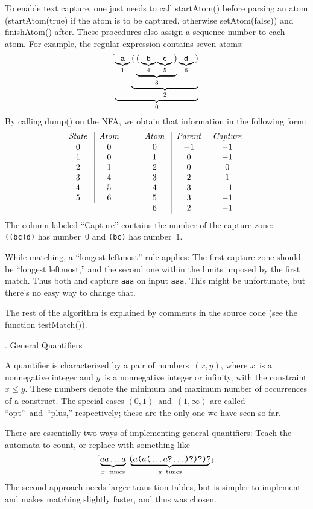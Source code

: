 To enable text capture, one just needs to call {\sf startAtom()} before parsing
an atom ({\sf startAtom(true)} if the atom is to be captured, otherwise {\sf
setAtom(false)}) and {\sf finishAtom()} after. These procedures also assign a
sequence number to each atom. For example, the regular expression 
contains seven atoms:
  $$\hbox{{$^{\scriptscriptstyle\lceil}$\tt$\underbrace{\underbrace{\tt a}_1\underbrace{{\tt (}
    \underbrace{{\tt (}\underbrace{\tt b}_4\underbrace{\tt
    c}_5{\tt )}}_3\underbrace{\tt d}_6{\tt )}}_2}_0$$\scriptscriptstyle\rfloor$}}$$
By calling {\sf dump()} on
the NFA, we obtain that information in the following form:
  $$\vtop{\halign{\g{$#$} \vrule & \g{$#$}\cr
    {\it State\/} & {\it Atom\/} \cr
  \noalign{\hrule}
    0             & 0 \cr
    1             & 0 \cr
    2             & 1 \cr
    3             & 4 \cr
    4             & 5 \cr
    5             & 6 \cr
  }}\qquad\vtop{\halign{\g{$#$} \vrule && \g{$#$} \cr
    {\it Atom\/} & {\it Parent\/} & {\it Capture\/} \cr
  \noalign{\hrule}
    0            &  -1            & -1 \cr
    1            &  0             & -1 \cr
    2            &  0             &  0 \cr
    3            &  2             &  1 \cr
    4            &  3             & -1 \cr
    5            &  3             & -1 \cr
    6            &  2             & -1 \cr
  }}$$
The column labeled ``Capture'' contains the number of the capture zone: {\tt
((bc)d)} has number~$0$ and {\tt (bc)} has number~$1$.

While matching, a ``longest-leftmost'' rule applies: The first capture zone
should be ``longest leftmost,'' and the second one within the limits imposed by
the first match. Thus both  and  capture {\tt aaa} on
input {\tt aaa}. This might be unfortunate, but there's no easy way to change
that.

The rest of the algorithm is explained by comments in the source code (see the
function {\sf testMatch()}).

. General Quantifiers

A quantifier is characterized by a pair of numbers~$(x, y)$, where $x$~is a
nonnegative integer and $y$~is a nonnegative integer or infinity, with the
constraint $x \le y$. These numbers denote the minimum and maximum number of
occurrences of a construct. The special cases $(0, 1)$~and~$(1, \infty)$ are
called ``opt''~and~``plus,'' respectively; these are the only one we have seen
so far.

There are essentially two ways of implementing general quantifiers: Teach the
automata to count, or replace  with something
like
  $$\hbox{\rx{$\underbrace{\hbox{$aa$}\ldots\hbox{$a$\vphantom)}}
    _{x\rm\ times}\,\,\underbrace{\!\hbox{($a$($a$(}\ldots\hbox{$a$?}\ldots\hbox{)?)?)?}\!}
    _{y\rm\ times}\,$}.}$$
The second approach needs larger transition tables, but is simpler to implement
and makes matching slightly faster, and thus was chosen.

